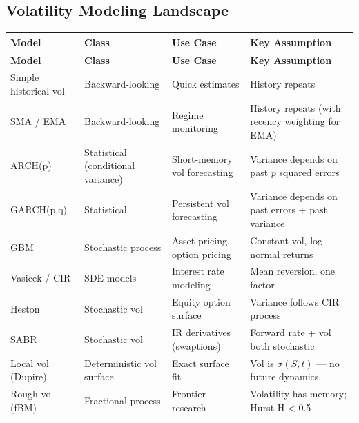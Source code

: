 \documentclass[12pt,openany]{book}
\theoremstyle{definition}
\theoremstyle{remark}
\begin{document}
\subsection{Volatility Modeling Landscape}
\begingroup
\footnotesize
\begin{longtable}{@{}L{0.15\textwidth}L{0.25\textwidth}L{0.25\textwidth}L{0.25\textwidth}@{}}
\toprule
\textbf{Model} & \textbf{Class} & \textbf{Use Case} & \textbf{Key Assumption} \\
\midrule
\endfirsthead
\toprule
\textbf{Model} & \textbf{Class} & \textbf{Use Case} & \textbf{Key Assumption} \\
\midrule
\endhead
Simple historical vol & Backward-looking & Quick estimates & History repeats \\
SMA / EMA & Backward-looking & Regime monitoring & History repeats (with recency weighting for EMA) \\
ARCH(p) & Statistical (conditional variance) & Short-memory vol forecasting & Variance depends on past $p$ squared errors \\
GARCH(p,q) & Statistical & Persistent vol forecasting & Variance depends on past errors + past variance \\
GBM & Stochastic process & Asset pricing, option pricing & Constant vol, log-normal returns \\
Vasicek / CIR & SDE models & Interest rate modeling & Mean reversion, one factor \\
Heston & Stochastic vol & Equity option surface & Variance follows CIR process \\
SABR & Stochastic vol & IR derivatives (swaptions) & Forward rate + vol both stochastic \\
Local vol (Dupire) & Deterministic vol surface & Exact surface fit & Vol is $\sigma(S,t)$ --- no future dynamics \\
Rough vol (fBM) & Fractional process & Frontier research & Volatility has memory; Hurst H < 0.5 \\
\bottomrule
\end{longtable}
\endgroup
\end{document}
